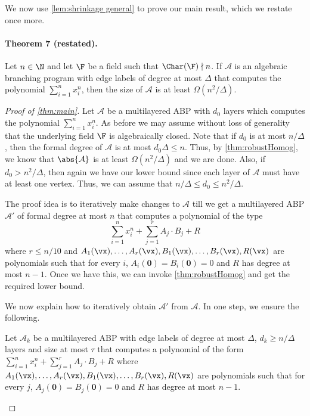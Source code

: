 We now use \autoref{lem:shrinkage general} to prove our main result, which we restate once more.
\paragraph{Theorem 7 (restated).} Let $n\in\N$ and let $\F$ be a field such that $\Char(\F)\nmid n$. If $\mathcal A$ is an algebraic branching program with edge labels of degree at most $\Delta$ that computes the polynomial $\sum_{i=1}^n x_i^n$, then the size of $\mathcal A$ is at least $\Omega(n^2/\Delta)$.
 
	
\begin{proof}[Proof of \autoref{thm:main}]
	Let $\mathcal{A}$ be a multilayered ABP with $d_0$ layers which computes the polynomial $\sum_{i = 1}^n x_i^n$. As before we may assume without loss of generality that the underlying field $\F$ is algebraically closed. Note that if $d_0$ is at most $n/\Delta$, then the formal degree of $\mathcal A$ is at most $d_0\Delta\le n$. Thus, by \autoref{thm:robustHomog}, we know that $\abs{\mathcal A}$ is at least $\Omega(n^2/\Delta)$ and we are done. Also, if $d_0 > n^2/\Delta$, then again we have our lower bound since each layer of $\mathcal{A}$ must have at least one vertex. Thus, we can assume that $n/\Delta \le d_0 \le n^2/\Delta$. 
		
	The proof idea is to iteratively make changes to $\mathcal{A}$ till we get a multilayered ABP $\mathcal{A}'$ of formal degree at most $n$ that computes a polynomial of the type 
	\[\sum_{i = 1}^n x_i^n + \sum_{j = 1}^r A_j\cdot B_j + R\]
	where $r \leq n/10$ and $A_1(\vx), \ldots, A_r(\vx), B_1(\vx), \ldots, B_r(\vx), R(\vx)$ are polynomials such that for every $i$, $A_i(\mathbf{0}) = B_i(\mathbf{0}) = 0$ and $R$ has degree at most $n-1$. 
	Once we have this, we can invoke \autoref{thm:robustHomog} and get the required lower bound.
		
	We now explain how to iteratively obtain $\mathcal{A}'$ from $\mathcal{A}$. In one step, we ensure the following.
		
	\begin{claim}\label{clm:oneStep}
		Let $\mathcal{A}_k$ be a multilayered ABP with edge labels of degree at most $\Delta$, $d_k \ge n/\Delta$ layers and size at most $\tau$ that computes a polynomial of the form $\sum_{i = 1}^n x_i^n + \sum_{j = 1}^r A_j\cdot B_j + R$ where $A_1(\vx), \ldots, A_r(\vx), B_1(\vx), \ldots, B_r(\vx), R(\vx)$ are polynomials such that for every $j$, $A_j(\mathbf{0}) = B_j(\mathbf{0}) = 0$ and $R$ has degree at most $n-1$.
			

\end{claim}
\end{proof}
